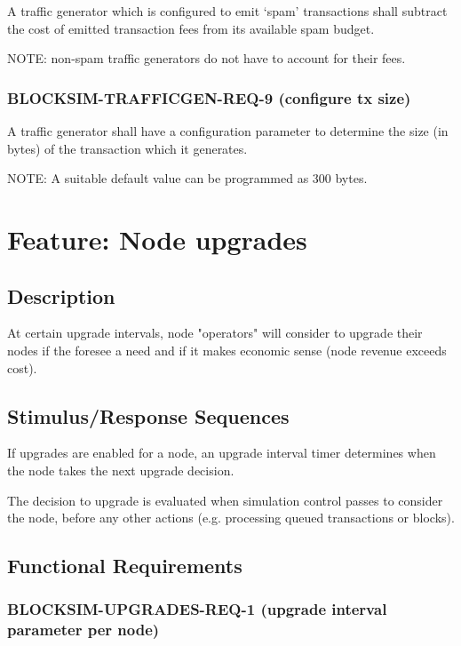 \documentclass{scrreprt}
\begin{document}
        A traffic generator which is configured to emit `spam' transactions
        shall subtract the cost of emitted transaction fees from its available
        spam budget.

        NOTE: non-spam traffic generators do not have to account for their
        fees.

      \subsubsection{BLOCKSIM-TRAFFICGEN-REQ-9 (configure tx size)}

        A traffic generator shall have a configuration parameter to
        determine the size (in bytes) of the transaction which it generates.

        NOTE: A suitable default value can be programmed as 300 bytes.

  \section{Feature: Node upgrades}

    \subsection{Description}

      At certain upgrade intervals, node "operators" will consider to upgrade
      their nodes if the foresee a need and if it makes economic sense
      (node revenue exceeds cost).

    \subsection{Stimulus/Response Sequences}

      If upgrades are enabled for a node, an upgrade interval timer determines
      when the node takes the next upgrade decision.

      The decision to upgrade is evaluated when simulation control passes to
      consider the node, before any other actions (e.g. processing queued
      transactions or blocks).

    \subsection{Functional Requirements}

      \subsubsection{BLOCKSIM-UPGRADES-REQ-1 (upgrade interval parameter per node)}
\end{document}
